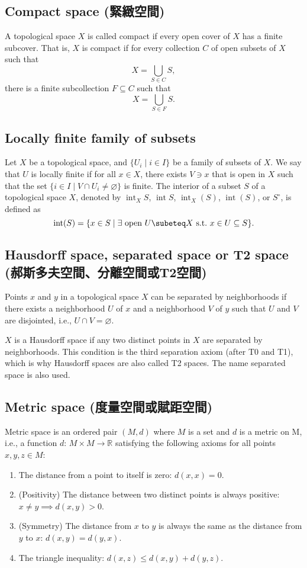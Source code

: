 \documentclass[a4paper,12pt]{article}
\begin{document}
\subsection{Compact space (緊緻空間)}
A topological space $X$ is called compact if every open cover of $X$ has a finite subcover. That is, $X$ is compact if for every collection $C$ of open subsets of $X$ such that
\[X=\bigcup_{S\in C}S,\]
there is a finite subcollection $F\subseteq C$ such that
\[X=\bigcup _{S\in F}S.\]
\subsection{Locally finite family of subsets}
Let $X$ be a topological space, and $\{U_i\mid i\in I\}$ be a family of subsets of $X$. We say that $U$ is locally finite if for all $x\in X$, there exists $V\ni x$ that is open in $X$ such that the set $\{i\in I\mid V\cap U_i\neq\varnothing\}$ is finite.
The interior of a subset $S$ of a topological space $X$, denoted by $\operatorname{int}_XS$, $\operatorname{int}S$, $\operatorname{int}_X(S)$, $\operatorname{int}(S)$, or $S^{\circ}$, is defined as
\[\operatorname{int}(S) = \{ x \in S \mid \exists \text{\ open\ } U\subeteq X \text{\ s.t.\ } x \in U \subseteq S \}.\]
\subsection{Hausdorff space, separated space or T2 space (郝斯多夫空間、分離空間或T2空間)}
Points $x$ and $y$ in a topological space $X$ can be separated by neighborhoods if there exists a neighborhood $U$ of $x$ and a neighborhood $V$ of $y$ such that $U$ and $V$ are disjointed, i.e., $U\cap V=\varnothing$.

$X$ is a Hausdorff space if any two distinct points in $X$ are separated by neighborhoods. This condition is the third separation axiom (after T0 and T1), which is why Hausdorff spaces are also called T2 spaces. The name separated space is also used.
\subsection{Metric space (度量空間或賦距空間)}
Metric space is an ordered pair $(M, d)$ where $M$ is a set and $d$ is a metric on M, i.e., a function $d:\,M\times M\to\mathbb{R}$ satisfying the following axioms for all points $x,y,z\in M$:
\begin{enumerate}
\item The distance from a point to itself is zero: $d(x,x)=0$.
\item (Positivity) The distance between two distinct points is always positive:$x\neq y\implies d(x,y)>0$.
\item (Symmetry) The distance from $x$ to $y$ is always the same as the distance from $y$ to $x$: $d(x,y)=d(y,x)$.
\item The triangle inequality: $d(x,z)\leq d(x,y)+d(y,z)$.
\end{enumerate}
\end{document}
